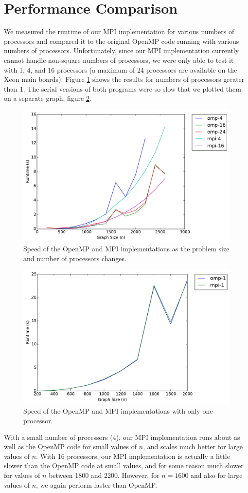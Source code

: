 \documentclass[11pt]{article}
\begin{document}
\section{Performance Comparison}
We measured the runtime of our MPI implementation for various numbers of processors and compared it to the original OpenMP code running with various numbers of processors.
Unfortunately, since our MPI implementation currently cannot handle non-square numbers of processors, we were only able to test it with 1, 4, and 16 processors (a maximum of 24 processors are available on the Xeon main boards).
Figure \ref{fig:mpi-omp} shows the results for numbers of processors greater than 1.
The serial versions of both programs were so slow that we plotted them on a separate graph, figure \ref{fig:serial}.

\begin{figure}[h]
	\centering
	\includegraphics[width=.8\textwidth]{mpi_omp_comparison.pdf}
	\caption{Speed of the OpenMP and MPI implementations as the problem size and number of processors changes.}
	\label{fig:mpi-omp}
\end{figure}

\begin{figure}[h]
	\centering
	\includegraphics[width=.8\textwidth]{serial.pdf}
	\caption{Speed of the OpenMP and MPI implementations with only one processor.}
	\label{fig:serial}
\end{figure}

With a small number of processors (4), our MPI implementation runs about as well as the OpenMP code for small values of $n$, and scales much better for large values of $n$.
With 16 processors, our MPI implementation is actually a little slower than the OpenMP code at small values, and for some reason much slower for values of $n$ between 1800 and 2200.
However, for $n = 1600$ and also for large values of $n$, we again perform faster than OpenMP.
\end{document}
